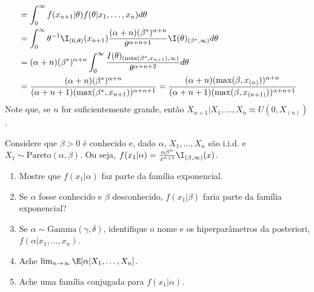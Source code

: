 {\begin{enumerate}[label=(\alph*)]
\begin{align*}
   &= \int_{0}^{\infty}{f(x_{n+1}|\theta)
   f(\theta|x_{1},\ldots,x_{n})d\theta}	\\
   &= \int_{0}^{\infty}{\theta^{-1}\I_{(0,\theta)}
   (x_{n+1}) \frac{(\alpha+n) (\beta^{*})^{\alpha+n}}
   {\theta^{\alpha+n+1}}\I(\theta)_{(\beta^{*},\infty)} d\theta} \\
   &= (\alpha+n) (\beta^{*})^{\alpha+n}\int_{0}^{\infty}{\frac{I(\theta)_{(\max(\beta^{*},x_{n+1}),\infty)}}{\theta^{\alpha+n+2}} d\theta} \\
   &= \frac{(\alpha+n) (\beta^{*})^{\alpha+n}}{(\alpha+n+1) (\max(\beta^{*},x_{n+1}))^{\alpha+n+1}}
   = \frac{(\alpha+n) (\max(\beta,x_{(n)}))^{\alpha+n}}{(\alpha+n+1) (\max(\beta,x_{(n+1)}))^{\alpha+n+1}}
  \end{align*}
  Note que, se $n$ for suficientemente grande, então
  $X_{n+1}|X_{1},\ldots,X_{n} \approx U(0,X_{(n)})$.
 \end{enumerate}
}{}

\begin{exercise}
 Considere que $\beta > 0$ é conhecido e, dado $\alpha$,
 $X_{1},\ldots,X_{n}$ são i.i.d. e $X_{1} \sim \text{Pareto}(\alpha,\beta)$.
 Ou seja, $f(x_{1}|\alpha) = \frac{\alpha \beta^{\alpha}}{x^{\alpha+1}}\I_{(\beta,\infty)}(x)$.
 \begin{enumerate}[label=(\alph*)]
  \item Mostre que $f(x_1|\alpha)$ faz parte da
  família exponencial.
  \item Se $\alpha$ fosse conhecido e
  $\beta$ desconhecido,
  $f(x_1|\beta)$ faria parte da família exponencial?
  \item Se $\alpha \sim \text{Gamma}(\gamma,\delta)$,
  identifique o nome e os hiperparâmetros da
  posteriori, $f(\alpha|x_{1},\ldots,x_{n})$.
  \item Ache $\lim_{n \rightarrow \infty} \E[\alpha|X_{1},\ldots,X_{n}]$.
  \item Ache uma família conjugada para
  $f(x_1|\alpha)$.
 \end{enumerate}
\end{exercise}

